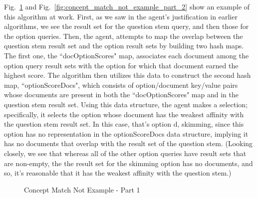 Fig.~\ref{fig:concept_match_not_example_part_1} and Fig.~\ref{fig:concept_match_not_example_part_2} show an example of this algorithm at work.  First, as we saw in the agent's justification in earlier algorithms, we see the result set for the question stem query, and then those for the option queries.  Then, the agent, attempts to map the overlap between the question stem result set and the option result sets by building two hash maps.  The first one, the ``docOptionScores" map, associates each document among the option query result sets with the option for which that document earned the highest score.  The algorithm then utilizes this data to construct the second hash map, ``optionScoreDocs", which consists of option/document key/value pairs whose documents are present in both the ``docOptionScores" map and in the question stem result set.  Using this data structure, the agent makes a selection; specifically, it selects the option whose document has the weakest affinity with the question stem result set.  In this case, that's option d, skimming, since this option has no representation in the optionScoreDocs data structure, implying it has no documents that overlap with the result set of the question stem.  (Looking closely, we see that whereas all of the other option queries have result sets that are non-empty, the the result set for the skimming option has no documents, and so, it's reasonable that it has the weakest affinity with the question stem.) 



\begin{figure}
\centering
\vspace{0.75in}
\caption{Concept Match Not Example - Part 1}
\label{fig:concept_match_not_example_part_1}
\end{figure}

